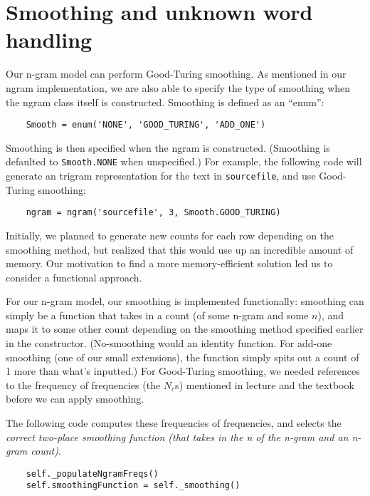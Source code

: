 \documentclass{article}
\begin{document}
\fi

\section{Smoothing and unknown word handling}

Our n-gram model can perform Good-Turing smoothing. As mentioned in our ngram implementation, we are also able to specify the type of smoothing when the ngram class itself is constructed. Smoothing is defined as an ``enum'':

{\small\begin{verbatim}
    Smooth = enum('NONE', 'GOOD_TURING', 'ADD_ONE')
\end{verbatim}}

Smoothing is then specified when the ngram is constructed. (Smoothing is defaulted to \texttt{Smooth.NONE} when unspecified.) For example, the following code will generate an trigram representation for the text in \texttt{sourcefile}, and use Good-Turing smoothing:
{\small\begin{verbatim}
    ngram = ngram('sourcefile', 3, Smooth.GOOD_TURING)
\end{verbatim}}

Initially, we planned to generate new counts for each row depending on the smoothing method, but realized that this would use up an incredible amount of memory. Our motivation to find a more memory-efficient solution led us to consider a functional approach.\par
For our n-gram model, our smoothing is implemented functionally: smoothing can simply be a function that takes in a count (of some n-gram and some $n$), and maps it to some other count depending on the smoothing method specified earlier in the constructor. (No-smoothing would an identity function. For add-one smoothing (one of our small extensions), the function simply spits out a count of 1 more than what's inputted.) For Good-Turing smoothing, we needed references to the frequency of frequencies (the $N_c$s) mentioned in lecture and the textbook before we can apply smoothing.\par

The following code computes these frequencies of frequencies, and selects the \emph{correct two-place smoothing function (that takes in the \emph{n} of the n-gram and an n-gram count)}.

{\small\begin{verbatim}
    self._populateNgramFreqs()
    self.smoothingFunction = self._smoothing()
\end{verbatim}}
\end{document}

